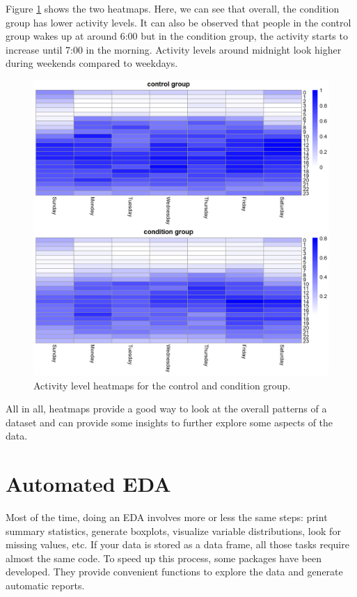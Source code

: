 \documentclass[
  11pt,
]{krantz}
\begin{document}
Figure \ref{fig:depheatmaps} shows the two heatmaps. Here, we can see that overall, the condition group has lower activity levels. It can also be observed that people in the control group wakes up at around 6:00 but in the condition group, the activity starts to increase until 7:00 in the morning. Activity levels around midnight look higher during weekends compared to weekdays.

\begin{figure}

{\centering \includegraphics[width=0.9\linewidth]{images/heatmaps} 

}

\caption{Activity level heatmaps for the control and condition group.}\label{fig:depheatmaps}
\end{figure}

All in all, heatmaps provide a good way to look at the overall patterns of a dataset and can provide some insights to further explore some aspects of the data.

\hypertarget{automated-eda}{%
\section{Automated EDA}\label{automated-eda}}

Most of the time, doing an EDA involves more or less the same steps: print summary statistics, generate boxplots, visualize variable distributions, look for missing values, etc. If your data is stored as a data frame, all those tasks require almost the same code. To speed up this process, some packages have been developed. They provide convenient functions to explore the data and generate automatic reports.
\end{document}
